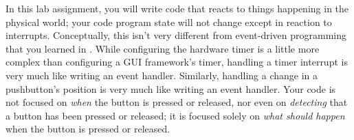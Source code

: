 In this lab assignment, you will write code that reacts to things happening in the physical world;
your code program state will not change except in reaction to interrupts.
Conceptually, this isn't very different from event-driven programming that you learned in \cstwo.
While configuring the hardware timer is a little more complex than configuring a GUI framework's timer, handling a timer interrupt is very much like writing an  event handler.
Similarly, handling a change in a pushbutton's position is very much like writing an  event handler.
Your code is not focused on \textit{when} the button is pressed or released, nor even on \textit{detecting} that a button has been pressed or released;
it is focused solely on \textit{what should happen} when the button is pressed or released.